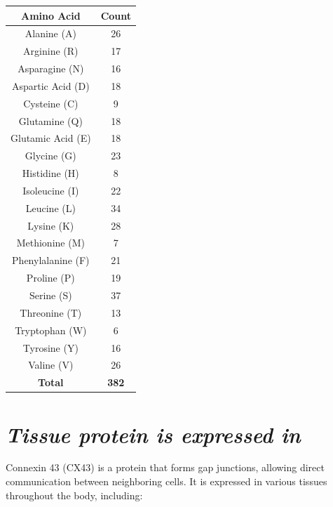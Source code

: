 \documentclass{article}
\begin{document}
\begin{center}
    \begin{tabular}{|c|c|}
        \hline
        \textbf{Amino Acid} & \textbf{Count} \\
        \hline
        Alanine (A) & 26 \\
        Arginine (R) & 17 \\
        Asparagine (N) & 16 \\
        Aspartic Acid (D) & 18 \\
        Cysteine (C) & 9 \\
        Glutamine (Q) & 18 \\
        Glutamic Acid (E) & 18 \\
        Glycine (G) & 23 \\
        Histidine (H) & 8 \\
        Isoleucine (I) & 22 \\
        Leucine (L) & 34 \\
        Lysine (K) & 28 \\
        Methionine (M) & 7 \\
        Phenylalanine (F) & 21 \\
        Proline (P) & 19 \\
        Serine (S) & 37 \\
        Threonine (T) & 13 \\
        Tryptophan (W) & 6 \\
        Tyrosine (Y) & 16 \\
        Valine (V) & 26 \\
        \hline
        \textbf{Total} & \textbf{382} \\
        \hline
    \end{tabular}
\end{center}
\section{\textit{Tissue protein is expressed in} }
Connexin 43 (CX43) is a protein that forms gap junctions, allowing direct communication between neighboring cells. It is expressed in various tissues throughout the body, including:
\end{document}
